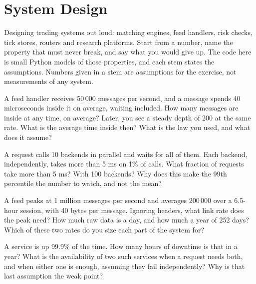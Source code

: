 \chapter{System Design}\label{ch:iv3:system-design}

\begin{ivtrains}
Designing trading systems out loud: matching engines, feed handlers, risk checks, tick stores, routers and research platforms. Start from a number, name the property that must never break, and say what you would give up. The code here is small Python models of those properties, and each stem states the assumptions. Numbers given in a stem are assumptions for the exercise, not measurements of any system.
\end{ivtrains}

\begin{question}\label{iq:iv3:system-design:1}
A feed handler receives 50\,000 messages per second, and a message spends 40 microseconds inside it on average, waiting included. How many messages are inside at any time, on average? Later, you see a steady depth of 200 at the same rate. What is the average time inside then? What is the law you used, and what does it assume?
\end{question}

\begin{question}\label{iq:iv3:system-design:2}
A request calls 10 backends in parallel and waits for all of them. Each backend, independently, takes more than 5 ms on 1\% of calls. What fraction of requests take more than 5 ms? With 100 backends? Why does this make the 99th percentile the number to watch, and not the mean?
\end{question}

\begin{question}\label{iq:iv3:system-design:3}
A feed peaks at 1 million messages per second and averages 200\,000 over a 6.5-hour session, with 40 bytes per message. Ignoring headers, what link rate does the peak need? How much raw data is a day, and how much a year of 252 days? Which of these two rates do you size each part of the system for?
\end{question}

\begin{question}\label{iq:iv3:system-design:4}
A service is up 99.9\% of the time. How many hours of downtime is that in a year? What is the availability of two such services when a request needs both, and when either one is enough, assuming they fail independently? Why is that last assumption the weak point?
\end{question}

